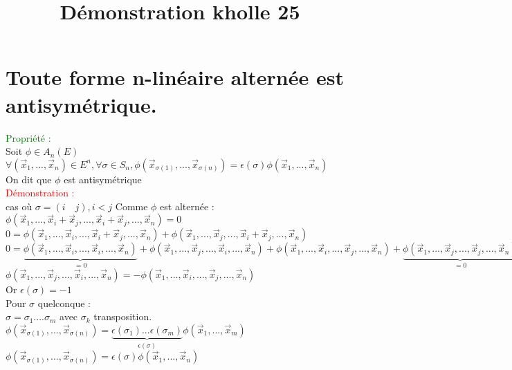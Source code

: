 \documentclass{article}
\begin{document}
\title{Démonstration kholle 25}
\date{}
\maketitle
\renewcommand{\thesection}{\Roman{section}}
	\setlength{\parindent}{1.5cm}
	\section{Toute forme n-linéaire alternée est antisymétrique.}
	\textcolor{green}{Propriété :} \\
	Soit $\phi \in A_n(E)$ \\
	$\forall (\vec x_1,...,\vec x_n) \in E^n, \forall \sigma \in S_n, \phi(\vec x_{\sigma(1)},...,\vec x_{\sigma(n)})=\epsilon(\sigma) \phi(\vec x_1,...,\vec x_n)$ \\
	On dit que $\phi$ est antisymétrique \\
	\textcolor{red}{Démonstration :} \\
	cas où $\sigma =(i \quad  j), i<j$ Comme $\phi$ est alternée : \\
	$\phi(\vec x_1,..., \vec x_i + \vec x_j,..., \vec x_i + \vec x_j,...,\vec x_n)=0$ \\
	$0=\phi(\vec x_1,..., \vec x_i,..., \vec x_i + \vec x_j,...,\vec x_n)+\phi(\vec x_1,...,  \vec x_j,..., \vec x_i + \vec x_j,...,\vec x_n) $ \\
	$0=\underbrace{\phi(\vec x_1,..., \vec x_i,..., \vec x_i ,...,\vec x_n)}_{=0}+\phi(\vec x_1,...,  \vec x_j,..., \vec x_i ,...,\vec x_n)+\phi(\vec x_1,..., \vec x_i,...,  \vec x_j,...,\vec x_n)+\underbrace{\phi(\vec x_1,...,  \vec x_j,..., \vec x_j,...,\vec x_n)}_{=0}$ \\
	$\phi(\vec x_1,..., \vec x_j,...,  \vec x_i,...,\vec x_n)=-\phi(\vec x_1,...,  \vec x_i,..., \vec x_j ,...,\vec x_n)$ \\
	Or $\epsilon(\sigma)=-1$ \\
	Pour $\sigma $ quelconque : \\
	$\sigma= \sigma_1 .... \sigma_m$ avec $\sigma_k$ transposition. \\
	$\phi(\vec x_{\sigma(1)},..., \vec x_{\sigma(n)})=\underbrace{\epsilon(\sigma_1)... \epsilon(\sigma_m)}_{\epsilon(\sigma)} \phi(\vec x_1,..., \vec x_m)$ \\
	$\phi(\vec x_{\sigma(1)},...,\vec x_{\sigma(n)})=\epsilon(\sigma) \phi(\vec x_1,...,\vec x_n)$
\end{document}
